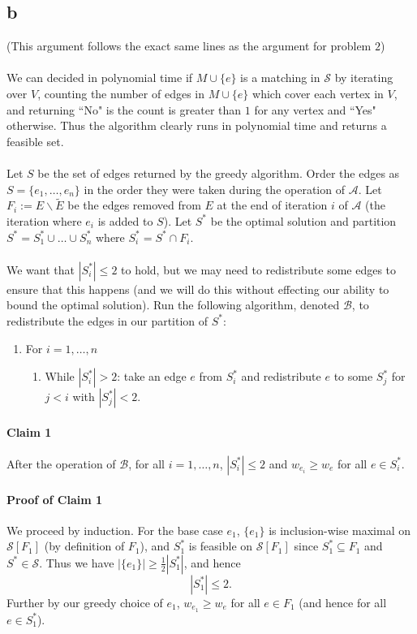 \documentclass[letterpaper,12pt,oneside,onecolumn]{article}
\newcommand{\cA}{\mathcal{A}} \newcommand{\cB}{\mathcal{B}}
\newcommand{\cS}{\mathcal{S}} \newcommand{\cT}{\mathcal{T}}
\begin{document}
\subsection{b}
(This argument follows the exact same lines as the argument for problem $2$)
\paragraph{}
We can decided in polynomial time if $M\cup \{e\}$ is a matching in $\cS$ by iterating over $V$, counting the number of edges in $M\cup\{e\}$ which cover each vertex in $V$, and returning ``No" is the count is greater than $1$ for any vertex and ``Yes" otherwise. Thus the algorithm clearly runs in polynomial time and returns a feasible set.
\paragraph{}
Let $S$ be the set of edges returned by the greedy algorithm. Order the edges as $S = \{e_1, \dots, e_n\}$ in the order they were taken during the operation of $\cA$. Let $F_i := E\backslash \tilde{E}$ be the edges removed from $E$ at the end of iteration $i$ of $\cA$ (the iteration where $e_i$ is added to $S$). Let $S^*$ be the optimal solution and partition $S^* = S^*_1 \cup \dots \cup S^*_n$ where $S^*_i = S^* \cap F_i$.
\paragraph{}
We want that $|S^*_i| \leq 2$ to hold, but we may need to redistribute some edges to ensure that this happens (and we will do this without effecting our ability to bound the optimal solution). Run the following algorithm, denoted $\cB$, to redistribute the edges in our partition of $S^*$:
\begin{enumerate}
\item For $i = 1, \dots, n$
\begin{enumerate}
\item While $|S^*_i| > 2$: take an edge $e$ from $S^*_i$ and redistribute $e$ to some $S^*_j$ for $j<i$ with $|S^*_j| < 2$.
\end{enumerate}
\end{enumerate}
\paragraph{Claim 1}
After the operation of $\cB$, for all $i = 1, \dots, n$, $|S^*_i| \leq 2$ and $w_{e_i} \geq w_e$ for all $e \in S^*_i$.
\paragraph{Proof of Claim 1}
We proceed by induction. For the base case $e_1$, $\{e_1\}$ is inclusion-wise maximal on $\cS[F_1]$ (by definition of $F_1$), and $S_1^*$ is feasible on $\cS[F_1]$ since $S^*_1 \subseteq F_1$ and $S^* \in \cS$. Thus we have $|\{e_1\}| \geq \frac{1}{2} |S_1^*|$, and hence
$$|S^*_1| \leq 2.$$
Further by our greedy choice of $e_1$, $w_{e_1} \geq w_e$ for all $e \in F_1$ (and hence for all $e \in S^*_1$).
\end{document}
